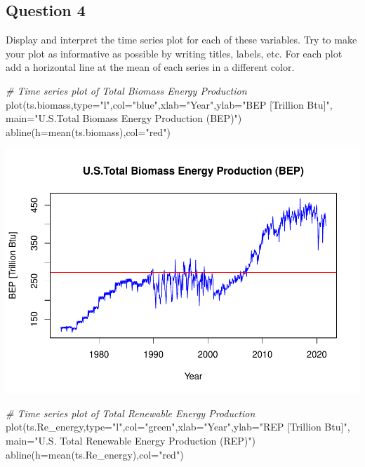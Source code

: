 \documentclass[
]{article}
\newenvironment{Shaded}{\begin{snugshade}}{\end{snugshade}}
\newcommand{\AttributeTok}[1]{\textcolor[rgb]{0.77,0.63,0.00}{#1}}
\newcommand{\CommentTok}[1]{\textcolor[rgb]{0.56,0.35,0.01}{\textit{#1}}}
\newcommand{\FunctionTok}[1]{\textcolor[rgb]{0.00,0.00,0.00}{#1}}
\newcommand{\NormalTok}[1]{#1}
\newcommand{\StringTok}[1]{\textcolor[rgb]{0.31,0.60,0.02}{#1}}
\begin{document}
\hypertarget{question-4}{%
\subsection{Question 4}\label{question-4}}

Display and interpret the time series plot for each of these variables.
Try to make your plot as informative as possible by writing titles,
labels, etc. For each plot add a horizontal line at the mean of each
series in a different color.

\begin{Shaded}
\begin{Highlighting}[]
\CommentTok{\# Time series plot of Total Biomass Energy Production}
\FunctionTok{plot}\NormalTok{(ts.biomass,}\AttributeTok{type=}\StringTok{"l"}\NormalTok{,}\AttributeTok{col=}\StringTok{"blue"}\NormalTok{,}\AttributeTok{xlab=}\StringTok{"Year"}\NormalTok{,}\AttributeTok{ylab=}\StringTok{"BEP [Trillion Btu]"}\NormalTok{,}
\AttributeTok{main=}\StringTok{"U.S.Total Biomass Energy Production (BEP)"}\NormalTok{)}
\FunctionTok{abline}\NormalTok{(}\AttributeTok{h=}\FunctionTok{mean}\NormalTok{(ts.biomass),}\AttributeTok{col=}\StringTok{"red"}\NormalTok{) }
\end{Highlighting}
\end{Shaded}

\includegraphics{YaredAsfaw_TSA_A02_Sp22_files/figure-latex/unnamed-chunk-11-1.pdf}

\begin{Shaded}
\begin{Highlighting}[]
\CommentTok{\# Time series plot of Total Renewable Energy Production}
\FunctionTok{plot}\NormalTok{(ts.Re\_energy,}\AttributeTok{type=}\StringTok{"l"}\NormalTok{,}\AttributeTok{col=}\StringTok{"green"}\NormalTok{,}\AttributeTok{xlab=}\StringTok{"Year"}\NormalTok{,}\AttributeTok{ylab=}\StringTok{"REP [Trillion Btu]"}\NormalTok{,}
\AttributeTok{main=}\StringTok{"U.S. Total Renewable Energy Production (REP)"}\NormalTok{) }
\FunctionTok{abline}\NormalTok{(}\AttributeTok{h=}\FunctionTok{mean}\NormalTok{(ts.Re\_energy),}\AttributeTok{col=}\StringTok{"red"}\NormalTok{)}
\end{Highlighting}
\end{Shaded}
\end{document}
